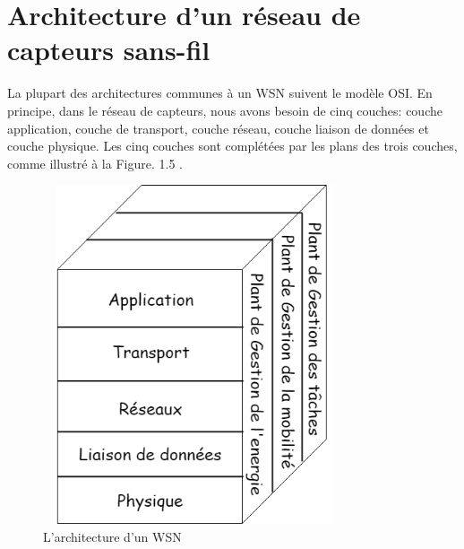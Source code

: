 \section{Architecture d’un réseau de capteurs sans-fil}
La plupart des architectures communes à un WSN suivent le modèle OSI. En principe, dans le réseau de capteurs, nous avons besoin de cinq couches: couche application, couche de transport, couche réseau, couche liaison de données et couche physique. Les cinq couches sont complétées par les plans des trois couches, comme illustré à la Figure. 1.5 .
\begin{figure}[H]
	\centering
	\includegraphics[width=9cm,height=10cm]{Chap1/5.png}
	\caption{L’architecture d’un WSN}
	\label{fig:AWSN}
\end{figure}


